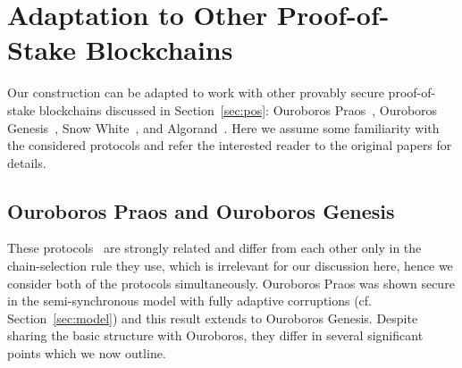 \section{Adaptation to Other Proof-of-Stake Blockchains}
\label{section:other}


Our construction can be adapted to work with other provably secure
proof-of-stake blockchains discussed in Section~\ref{sec:pos}:
Ouroboros Praos~\cite{praos},
Ouroboros Genesis~\cite{genesis},
Snow White~\cite{snowwhite}, and
Algorand~\cite{algorand}.
Here we assume some familiarity with the
considered protocols and refer the interested reader to the original papers for
details.

\subsection{Ouroboros Praos and Ouroboros Genesis}

These protocols~\cite{praos,genesis} are strongly related and differ from each
other only in the chain-selection
rule they use, which is irrelevant for our discussion here, hence we
consider both of the protocols simultaneously.
Ouroboros Praos was shown secure in the
semi-synchronous model with fully adaptive corruptions (cf.
Section~\ref{sec:model}) and this result extends to Ouroboros Genesis.
Despite sharing the basic structure with Ouroboros,
they differ in several significant points which we now outline.

